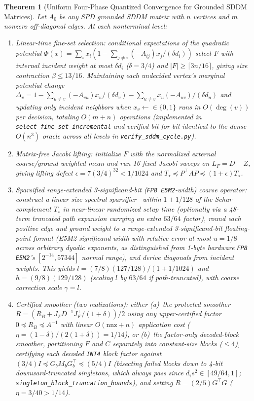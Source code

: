 \documentclass[10pt]{article}
\newtheorem{theorem}{Theorem}
\begin{document}
\begin{theorem}[Uniform Four-Phase Quantized Convergence for Grounded SDDM Matrices]
Let $A_0$ be any SPD grounded SDDM matrix with $n$ vertices and $m$ nonzero off-diagonal edges. At each nonterminal level:
\begin{enumerate}
  \item \emph{Linear-time fine-set selection:} conditional expectations of the quadratic potential $\Phi(x) = \sum_i x_i(1 - \sum_{j \neq i}(-A_{ij})x_j/(\delta d_i))$ select $F$ with internal incident weight at most $\delta d_i$ ($\delta = 3/4$) and $|F| \ge \lceil 3n/16\rceil$, giving size contraction $\beta \le 13/16$. Maintaining each undecided vertex's marginal potential change $\Delta_v = 1 - \sum_{u \neq v}(-A_{vu})x_u/(\delta d_v) - \sum_{u \neq v} x_u(-A_{uv})/(\delta d_u)$ and updating only incident neighbors when $x_v \leftarrow \in \{0,1\}$ runs in $O(\deg(v))$ per decision, totaling $O(m+n)$ operations (implemented in \texttt{select\_fine\_set\_incremental} and verified bit-for-bit identical to the dense $O(n^3)$ oracle across all levels in \texttt{verify\_sddm\_cycle.py}).
  \item \emph{Matrix-free Jacobi lifting:} initialize $F$ with the normalized external coarse/ground weighted mean and run 16 fixed Jacobi sweeps on $L_F = D - Z$, giving lifting defect $\epsilon = 7(3/4)^{32} < 1/1024$ and $T_\star \preceq P^\top A P \preceq (1+\epsilon)T_\star$.
  \item \emph{Sparsified range-extended 3-significand-bit (\texttt{FP8 E5M2}-width) coarse operator:} construct a linear-size spectral sparsifier~\cite{durfee2017schur,lee2015sparsification} within $1 \pm 1/128$ of the Schur complement $T_\star$ in near-linear randomized setup time (optionally via a 48-term truncated path expansion carrying an extra $63/64$ factor), round each positive edge and ground weight to a range-extended 3-significand-bit floating-point format (E5M2 significand width with relative error at most $u = 1/8$ across arbitrary dyadic exponents, as distinguished from 1-byte hardware \texttt{FP8 E5M2}'s $[2^{-14}, 57344]$ normal range), and derive diagonals from incident weights. This yields $l = (7/8)(127/128)/(1 + 1/1024)$ and $h = (9/8)(129/128)$ (scaling $l$ by $63/64$ if path-truncated), with coarse correction scale $\gamma = l$.
  \item \emph{Certified smoother (two realizations):} either (a)~the \emph{protected smoother} $R = (R_B + J_F D^{-1} J_F^\top/(1+\delta))/2$ using any upper-certified factor $0 \preceq R_B \preceq A^{-1}$ with linear $O(\mathrm{nnz}+n)$ application cost ($\eta = (1-\delta)/(2(1+\delta)) = 1/14$), or (b)~the \emph{factor-only decoded-block smoother}, partitioning $F$ and $C$ separately into constant-size blocks ($\le 4$), certifying each decoded \texttt{INT4} block factor against $(3/4)I \preceq G_b M_b G_b^\top \preceq (5/4)I$ (bisecting failed blocks down to 4-bit downward-truncated singletons, which always pass since $d_i s^2 \in [49/64,1]$; \texttt{singleton\_block\_truncation\_bounds}), and setting $R = (2/5)G^\top G$ ($\eta = 3/40 > 1/14$).

\end{enumerate}
\end{theorem}
\end{document}
